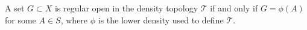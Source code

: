 A set $G \subset X$ is regular open in the density topology $\mathcal{T}$ if and only if $G = \phi(A)$ for some $A \in S$, where $\phi$ is the lower density used to define $\mathcal{T}$.
